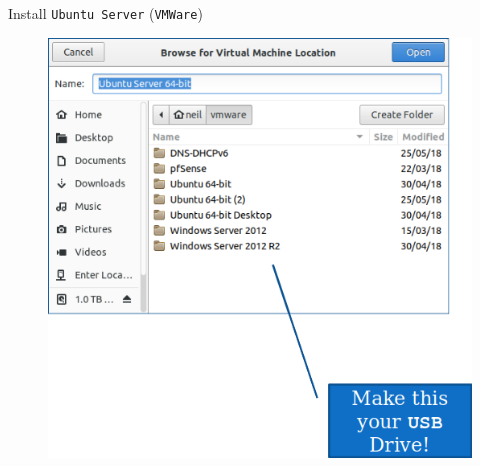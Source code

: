 \documentclass{beamer}
\begin{document}
\begin{frame}{Install \texttt{Ubuntu Server} (\texttt{VMWare})}
\begin{center}
\begin{figure}
\begin{overprint}
        \centering{}
        \centering\includegraphics[width=.6\textwidth]{VMWare5.png}
        \centering{}

\end{overprint}
\end{figure}
\end{center}
\end{frame}
\end{document}
